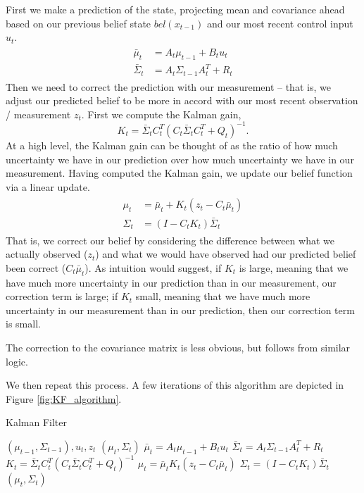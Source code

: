 \documentclass[twoside]{article}
\begin{document}
\par
First we make a prediction of the state, projecting mean and covariance ahead based on our previous belief state $bel(x_{t-1})$ and our most recent control input $u_t$.
\begin{align}
\begin{split}
\bar{\mu}_t &= A_t\mu_{t-1}+B_t u_t \\
\bar{\Sigma}_t &= A_t\Sigma_{t-1} A_t^{T} + R_t
\end{split}
\label{LinDyn}
\end{align}
Then we need to correct the prediction with our measurement -- that is, we adjust our predicted belief to be more in accord with our most recent observation / measurement $z_t$. First we compute the Kalman gain,
\begin{equation}
K_t = \bar{\Sigma}_{t}C_t^{T}(C_t\bar{\Sigma}_{t}C_t^{T}+Q_t)^{-1}.
\end{equation}
At a high level, the Kalman gain can be thought of as the ratio of how much uncertainty we have in our prediction over how much uncertainty we have in our measurement. Having computed the Kalman gain, we update our belief function via a linear update.
\begin{align}
\begin{split}
\mu_t &= \bar{\mu}_t + K_t(z_t-C_t\bar\mu_{t})\\
\Sigma_t &= (I-C_t K_t)\bar{\Sigma}_t
\end{split}
\label{KF}
\end{align}
That is, we correct our belief by considering the difference between what we actually observed ($z_t$) and what we would have observed had our predicted belief been correct ($C_t\bar\mu_{t}$). As intuition would suggest, if $K_t$ is large, meaning that we have much more uncertainty in our prediction than in our measurement, our correction term is large; if $K_t$ small, meaning that we have much more uncertainty in our measurement than in our prediction, then our correction term is small.

\par
The correction to the covariance matrix is less obvious, but follows from similar logic.

\par
We then repeat this process. A few iterations of this algorithm are depicted in Figure \ref{fig:KF_algorithm}.

\begin{algorithm}[H]
\caption{Kalman Filter}\label{alg:KF}
\begin{algorithmic}[1]
     $(\mu_{t-1}, \Sigma_{t-1}), u_t, z_t$
     $\left(\mu_t, \Sigma_t\right)$
    \State $	\bar{\mu}_t = A_t\mu_{t-1}+B_t u_t$
	\State $	\bar{\Sigma}_t = A_t\Sigma_{t-1} A_t^{T} + R_t$
	\State $ 	K_t = \bar{\Sigma}_{t}C_t^{T}(C_t\bar{\Sigma}_{t}C_t^{T}+Q_t)^{-1}$
	\State $    \mu_t = \bar{\mu}_t K_t(z_t-C_t\bar\mu_{t})$
	\State $   \Sigma_t = (I-C_t K_t)\bar{\Sigma}_t$
	 $\left(\mu_t, \Sigma_t\right)$
\end{algorithmic}
\end{algorithm}
\end{document}
